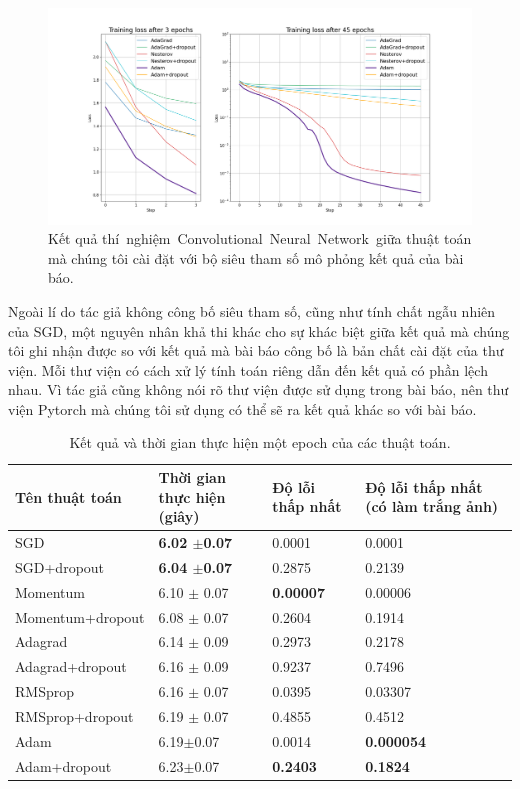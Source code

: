 \begin{figure}[htp]
	\centering
	\includegraphics[width=140 mm]{images/cnn-rep.png}
	\caption{Kết quả thí nghiệm Convolutional Neural Network giữa thuật toán mà chúng tôi cài đặt với bộ siêu tham số mô phỏng kết quả của bài báo.}
	\label{fig:exp-cnn-rep}
\end{figure}

Ngoài lí do tác giả không công bố siêu tham số, cũng như tính chất ngẫu nhiên của SGD, một nguyên nhân khả thi khác cho sự khác biệt giữa kết quả mà chúng tôi ghi nhận được so với kết quả mà bài báo công bố là bản chất cài đặt của thư viện. Mỗi thư viện có cách xử lý tính toán riêng dẫn đến kết quả có phần lệch nhau. Vì tác giả cũng không nói rõ thư viện được sử dụng trong bài báo, nên thư viện Pytorch mà chúng tôi sử dụng có thể sẽ ra kết quả khác so với bài báo.

\begin{table}
	\begin{tabular}{|l|m{}|m{}|m{}|}
		\hline
		Tên thuật toán & Thời gian thực hiện (giây) & Độ lỗi thấp nhất & Độ lỗi thấp nhất (có làm trắng ảnh) \\
		\hline
		SGD                   & \textbf{6.02 $\pm $0.07} & 0.0001 & 0.0001 \\
		SGD+dropout           & \textbf{6.04 $\pm $0.07} & 0.2875 & 0.2139 \\
		\hline
		Momentum         & 6.10 $\pm$ 0.07 & \textbf{0.00007} & 0.00006 \\
		Momentum+dropout & 6.08 $\pm$ 0.07 & 0.2604 & 0.1914 \\
		\hline
		Adagrad           & 6.14 $\pm$ 0.09 & 0.2973 & 0.2178 \\
		Adagrad+dropout   & 6.16 $\pm$ 0.09 & 0.9237 & 0.7496 \\
		\hline
		RMSprop           & 6.16 $\pm$ 0.07 & 0.0395 & 0.03307 \\
		RMSprop+dropout   & 6.19 $\pm$ 0.07 & 0.4855 & 0.4512 \\
		\hline
		Adam         & 6.19$\pm$0.07 & 0.0014          & \textbf{0.000054} \\
		Adam+dropout & 6.23$\pm$0.07 & \textbf{0.2403} & \textbf{0.1824} \\
		\hline
	\end{tabular}
\caption{\label{tab:cnn-results}Kết quả và thời gian thực hiện một epoch của các thuật toán.}
\end{table}

